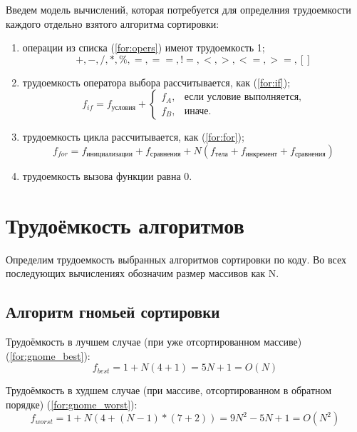 Введем модель вычислений, которая потребуется для определния трудоемкости каждого отдельно взятого алгоритма сортировки:
\begin{enumerate}
	\item операции из списка (\ref{for:opers}) имеют трудоемкость 1;
	\begin{equation}
		\label{for:opers}
		+, -, /, *, \%, =, ==, !=, <, >, <=, >=, []
	\end{equation}
	\item трудоемкость оператора выбора  рассчитывается, как (\ref{for:if});
	\begin{equation}
		\label{for:if}
		f_{if} = f_{\text{условия}} +
		\begin{cases}
			f_A, & \text{если условие выполняется,}\\
			f_B, & \text{иначе.}
		\end{cases}
	\end{equation}
	\item трудоемкость цикла рассчитывается, как (\ref{for:for});
	\begin{equation}
		\label{for:for}
		f_{for} = f_{\text{инициализации}} + f_{\text{сравнения}} + N(f_{\text{тела}} + f_{\text{инкремент}} + f_{\text{сравнения}})
	\end{equation}
	\item трудоемкость вызова функции равна 0.
\end{enumerate}

\section{Трудоёмкость алгоритмов}

Определим трудоемкость выбранных алгоритмов сортировки по коду. Во всех последующих вычислениях обозначим размер массивов как N.

\subsection{Алгоритм гномьей сортировки}

Трудоёмкость в лучшем случае (при уже отсортированном массиве) (\ref{for:gnome_best}):
\begin{equation}
	\label{for:gnome_best}
    f_{best} = 1 + N(4 + 1) = 5N + 1 = O(N)
\end{equation}

Трудоёмкость в худшем случае (при массиве, отсортированном в обратном порядке) (\ref{for:gnome_worst}):
\begin{equation}
	\label{for:gnome_worst}
    f_{worst} = 1 + N(4 + (N - 1) * (7 + 2)) = 9N^2 - 5N + 1 = O(N^2)
\end{equation}

